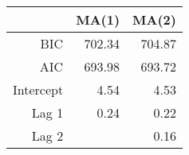 \begin{table}[ht]
\centering
\begin{tabular}{rrr}
  \hline
 & MA(1) & MA(2) \\ 
  \hline
BIC & 702.34 & 704.87 \\ 
  AIC & 693.98 & 693.72 \\ 
  Intercept & 4.54 & 4.53 \\ 
  Lag 1 & 0.24 & 0.22 \\ 
  Lag 2 &  & 0.16 \\ 
   \hline
\end{tabular}
\end{table}
